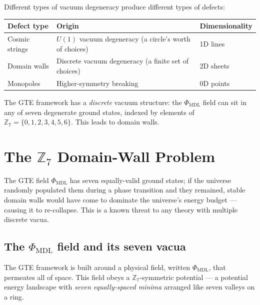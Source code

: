 \documentclass[11pt,a4paper]{article}
\newcommand{\PHIMDL}{\Phi_{\mathrm{MDL}}}
\newcommand{\ZS}{\mathbb{Z}_7}
\begin{document}
Different types of vacuum degeneracy produce different types of defects:

\begin{center}
\begin{tabular}{lll}
\toprule
Defect type & Origin & Dimensionality \\
\midrule
Cosmic strings & $U(1)$ vacuum degeneracy (a circle's worth of choices) & 1D lines \\
Domain walls & Discrete vacuum degeneracy (a finite set of choices) & 2D sheets \\
Monopoles & Higher-symmetry breaking & 0D points \\
\bottomrule
\end{tabular}
\end{center}

\medskip
\noindent
The GTE framework has a \emph{discrete} vacuum structure: the
$\PHIMDL$ field can sit in any of seven degenerate ground states,
indexed by elements of $\ZS = \{0, 1, 2, 3, 4, 5, 6\}$.
This leads to domain walls.

\section{The \texorpdfstring{$\mathbb{Z}_7$}{Z7} Domain-Wall Problem}

\begin{tcolorbox}[colback=boxblue,colframe=blue!40!black,
  title=The domain-wall problem in one sentence]
The GTE field $\PHIMDL$ has seven equally-valid ground states; if the universe
randomly populated them during a phase transition and they remained, stable
domain walls would have come to dominate the universe's energy budget ---
causing it to re-collapse. This is a known threat to any theory with multiple
discrete vacua.
\end{tcolorbox}

\subsection{The \texorpdfstring{$\PHIMDL$}{PhiMDL} field and its seven vacua}

The GTE framework is built around a physical field, written $\PHIMDL$, that
permeates all of space.
This field obeys a $\ZS$-symmetric potential --- a potential energy landscape
with \emph{seven equally-spaced minima} arranged like seven valleys on a ring.
\end{document}
